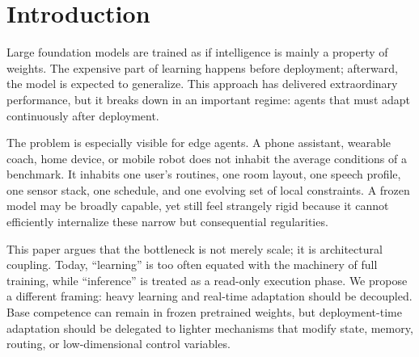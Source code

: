 \documentclass[11pt,a4paper]{article}
\begin{document}
\section{Introduction}

Large foundation models are trained as if intelligence is mainly a property of weights. The expensive part of learning happens before deployment; afterward, the model is expected to generalize. This approach has delivered extraordinary performance, but it breaks down in an important regime: agents that must adapt continuously after deployment.

The problem is especially visible for edge agents. A phone assistant, wearable coach, home device, or mobile robot does not inhabit the average conditions of a benchmark. It inhabits one user's routines, one room layout, one speech profile, one sensor stack, one schedule, and one evolving set of local constraints. A frozen model may be broadly capable, yet still feel strangely rigid because it cannot efficiently internalize these narrow but consequential regularities.

This paper argues that the bottleneck is not merely scale; it is architectural coupling. Today, ``learning'' is too often equated with the machinery of full training, while ``inference'' is treated as a read-only execution phase. We propose a different framing: heavy learning and real-time adaptation should be decoupled. Base competence can remain in frozen pretrained weights, but deployment-time adaptation should be delegated to lighter mechanisms that modify state, memory, routing, or low-dimensional control variables.
\end{document}
